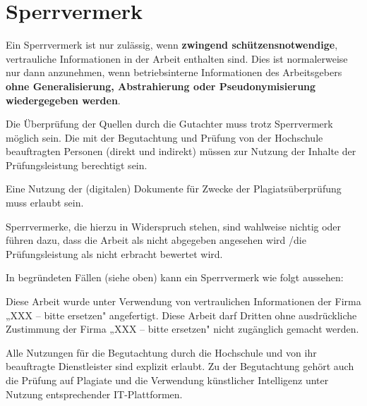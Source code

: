 {}
\section*{Sperrvermerk}


Ein Sperrvermerk ist nur zulässig, wenn \textbf{zwingend schützensnotwendige}, vertrauliche Informationen in der Arbeit enthalten sind. Dies ist normalerweise nur dann anzunehmen, wenn betriebsinterne Informationen des Arbeitsgebers \textbf{ohne Generalisierung, Abstrahierung oder Pseudonymisierung wiedergegeben werden}.

Die Überprüfung der Quellen durch die Gutachter muss trotz Sperrvermerk möglich sein. Die mit der Begutachtung und Prüfung von der Hochschule beauftragten Personen (direkt und indirekt) müssen zur Nutzung der Inhalte der Prüfungsleistung berechtigt sein.

Eine Nutzung der (digitalen) Dokumente für Zwecke der Plagiatsüberprüfung muss erlaubt sein.

Sperrvermerke, die hierzu in Widerspruch stehen, sind wahlweise nichtig oder führen dazu, dass die Arbeit als nicht abgegeben angesehen wird /die Prüfungsleistung als nicht erbracht bewertet wird.

In begründeten Fällen (siehe oben) kann ein Sperrvermerk wie folgt aussehen:

Diese Arbeit wurde unter Verwendung von vertraulichen Informationen der Firma „XXX -- bitte ersetzen" angefertigt. Diese Arbeit darf Dritten ohne ausdrückliche Zustimmung der Firma „XXX -- bitte ersetzen" nicht zugänglich gemacht werden.

Alle Nutzungen für die Begutachtung durch die Hochschule und von ihr beauftragte Dienstleister sind explizit erlaubt. Zu der Begutachtung gehört auch die Prüfung auf Plagiate und die Verwendung künstlicher Intelligenz unter Nutzung entsprechender IT-Plattformen.
